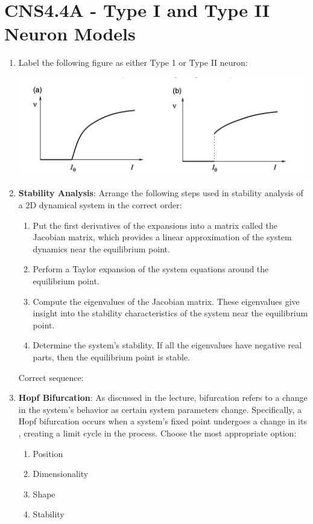 \documentclass[11pt,letterpaper]{article}
\begin{document}
\section{CNS4.4A - Type I and Type II Neuron Models}
\begin{enumerate}
    \item Label the following figure as either Type 1 or Type II neuron:
    \begin{center}
        \includegraphics[scale=0.7]{4.1.png}
    \end{center}

    \item \textbf{Stability Analysis}: Arrange the following steps used in stability analysis of a 2D dynamical system in the correct order:
    \begin{enumerate}
        \item Put the first derivatives of the expansions into a matrix called the Jacobian matrix, which provides a linear approximation of the system dynamics near the equilibrium point.
        \item Perform a Taylor expansion of the system equations around the equilibrium point.
        \item Compute the eigenvalues of the Jacobian matrix. These eigenvalues give insight into the stability characteristics of the system near the equilibrium point.
        \item Determine the system's stability. If all the eigenvalues have negative real parts, then the equilibrium point is stable.
    \end{enumerate}
    \vspace{0.5 cm}
    Correct sequence: \underline{\hspace{6 cm}}
    \vspace{0.5 cm}

    \item \textbf{Hopf Bifurcation}: As discussed in the lecture, bifurcation refers to a change in the system's behavior as certain system parameters change. Specifically, a Hopf bifurcation occurs when a system's fixed point undergoes a change in its \underline{\hspace{2 cm}}, creating a limit cycle in the process. Choose the most appropriate option:
    \begin{enumerate}
        \item Position
        \item Dimensionality
        \item Shape
        \item Stability
    \end{enumerate}


\end{enumerate}
\end{document}
